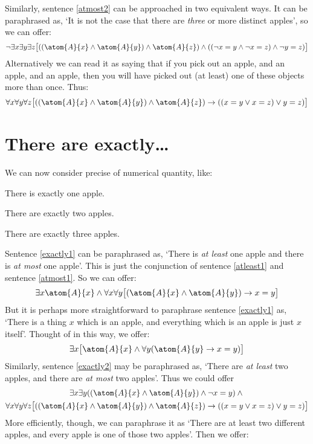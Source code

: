 Similarly, sentence \ref{atmost2} can be approached in two equivalent ways. It can be paraphrased as, `It is not the case that there are \emph{three} or more distinct apples', so we can offer:
$$\enot \exists x \exists y\exists z\bigl[((\atom{A}{x} \eand \atom{A}{y}) \eand \atom{A}{z}) \eand ((\enot x = y \eand \enot x = z) \eand \enot y = z)\bigr]$$
Alternatively we can read it as saying that if you pick out an apple, and an apple, and an apple, then you will have picked out (at least) one of these objects more than once. Thus:
$$\forall x\forall y\forall z\bigl[((\atom{A}{x} \eand \atom{A}{y}) \eand \atom{A}{z}) \eif ((x=y \eor x=z) \eor y=z)\bigr]$$


\section{There are exactly\ldots}\label{sec:exactlyn}
We can now consider precise  of numerical quantity, like:
\begin{earg}
\item[\ex{exactly1}] There is exactly one apple.
\item[\ex{exactly2}] There are exactly two apples.
\item[\ex{exactly3}] There are exactly three apples.
\end{earg}
Sentence \ref{exactly1} can be paraphrased as, `There is \emph{at least} one apple and there is \emph{at most} one apple'. This is just the conjunction of sentence \ref{atleast1} and sentence \ref{atmost1}. So we can offer:
$$\exists x \atom{A}{x} \eand \forall x\forall y\bigl[(\atom{A}{x} \eand \atom{A}{y}) \eif x=y\bigr]$$
But it is perhaps more straightforward to paraphrase sentence \ref{exactly1} as, `There is a thing $x$ which is an apple, and everything which is an apple is just $x$ itself'. Thought of in this way, we offer: 
\[
	\exists x\bigl[\atom{A}{x} \eand \forall y(\atom{A}{y} \eif x= y)\bigr]
\]
Similarly, sentence \ref{exactly2} may be paraphrased as, `There are \emph{at least} two apples, and there are \emph{at most} two apples'. Thus we could offer 
\begin{multline*}
  \exists x \exists y((\atom{A}{x} \eand \atom{A}{y}) \eand \enot x = y) \eand {}\\
  \forall x\forall y\forall z\bigl[((\atom{A}{x} \eand \atom{A}{y}) \eand \atom{A}{z}) \eif ((x=y \eor x=z) \eor y=z)\bigr]
\end{multline*}
More efficiently, though, we can paraphrase it as `There are at least two different apples, and every apple is one of those two apples'. Then we offer:
